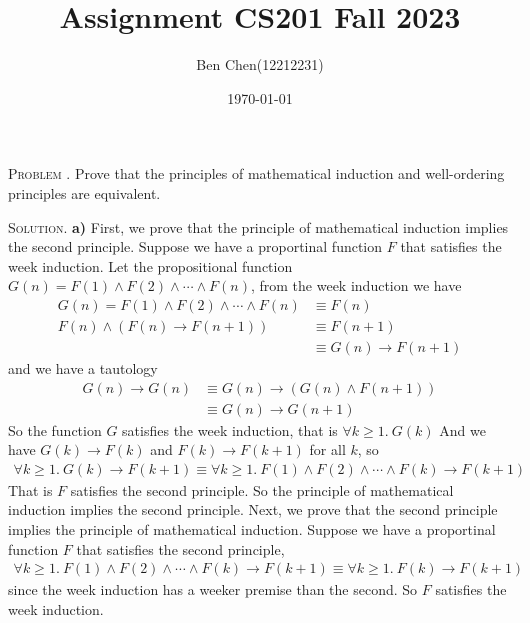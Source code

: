 \documentclass[12pt, a4paper, oneside]{article}
\title{\textbf{Assignment CS201 Fall 2023}}
\author{Ben Chen(12212231)}
\date{\today}
\newcounter{problemname}
\newenvironment{problem}{\stepcounter{problemname}\par\noindent\textsc{Problem \arabic{problemname}. }}{\\\par}
\newenvironment{solution}{\par\noindent\textsc{Solution. }}{\\\par}
\begin{document}
\maketitle

\begin{problem}
    Prove that the principles of mathematical induction and well-ordering principles are equivalent.
\end{problem}

\begin{solution}
    \textbf{a)} First, we prove that the principle of mathematical induction implies the second principle.
    Suppose we have a proportinal function $F$ that satisfies the week induction.
    Let the propositional function $G(n) = F(1)\wedge F(2) \wedge \cdots \wedge F(n)$, from the week induction we have
    \begin{align*}
        G(n) = F(1)\wedge F(2) \wedge \cdots \wedge F(n) &\equiv F(n) \\
        F(n) \wedge (F(n) \rightarrow F(n+1)) &\equiv F(n+1) \\
        &\equiv G(n) \rightarrow F(n+1)
    \end{align*}
    and we have a tautology
    \begin{align*}
        G(n) \rightarrow G(n) &\equiv G(n) \rightarrow (G(n)\wedge F(n+1)) \\
        &\equiv G(n) \rightarrow G(n+1)
    \end{align*}
    So the function $G$ satisfies the week induction, that is $\forall k\ge 1.\ G(k)$
    \newline And we have $G(k) \rightarrow F(k)$ and $F(k) \rightarrow F(k+1)$ for all $k$, so
    \begin{align*}
        \forall k\ge 1.\ G(k) \rightarrow F(k+1) \equiv \forall k\ge 1.\ F(1)\wedge F(2) \wedge \cdots \wedge F(k) \rightarrow F(k+1)
    \end{align*}
    That is $F$ satisfies the second principle. So the principle of mathematical induction implies the second principle.
    \newline\indent Next, we prove that the second principle implies the principle of mathematical induction.
    Suppose we have a proportinal function $F$ that satisfies the second principle,
    \begin{align*}
        \forall k\ge 1.\ F(1)\wedge F(2) \wedge \cdots \wedge F(k) \rightarrow F(k+1) \equiv \forall k\ge 1.\ F(k) \rightarrow F(k+1)
    \end{align*}
    since the week induction has a weeker premise than the second. So $F$ satisfies the week induction.

\end{solution}
\end{document}
